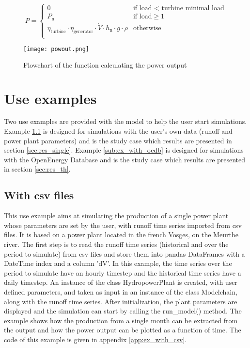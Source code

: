 \begin{equation}
  \label{eq_pow}
P= \left\{
    \begin{array}{ll}
	0 & \mbox{if load < turbine minimal load}\\
        P_\mathrm{n} & \mbox{if load}\geq 1 \\
        \eta_\mathrm{turbine} \cdot \eta_\mathrm{generator} \cdot \dot{V} \cdot h_\mathrm{n} \cdot g \cdot \rho & \mbox{otherwise}\\
    \end{array}
\right.
\end{equation}

\begin{figure}[H]
\centering
\texttt{[image: powout.png]}
\caption{Flowchart of the function calculating the power output}
\label{powout}
\end{figure}



\section{Use examples}
Two use examples are provided with the model to help the user start simulations. Example \ref{sub:ex_with_csv} is designed for simulations with the user's own data (runoff and power plant parameters) and is the study case which results are presented in section \ref{sec:res_single}. Example \ref{sub:ex_with_oedb} is designed for simulations with the OpenEnergy Database and is the study case which results are presented in section  \ref{sec:res_th}.

\subsection{With csv files}
\label{sub:ex_with_csv}

This use example aims at simulating the production of a single power plant whose parameters are set by the user, with runoff time series imported from csv files. It is based on a power plant located in the french Vosges, on the Meurthe river. \newline
The first step is to read the runoff time series (historical and over the period to simulate) from csv files and store them into pandas DataFrames with a DateTime index and a column 'dV'.
In this example, the time series over the period to simulate have an hourly timestep and the historical time series have a daily timestep. An instance of the class HydropowerPlant is created, with user defined parameters, and taken as input in an instance of the class Modelchain, along with the runoff time series. \newline
After initialization, the plant parameters are displayed and the simulation can start by calling the run{\_}model() method. The example shows how the production from a single month can be extracted from the output and how the power output can be plotted as a function of time. \newline
The code of this example is given in appendix \ref{app:ex_with_csv}.

